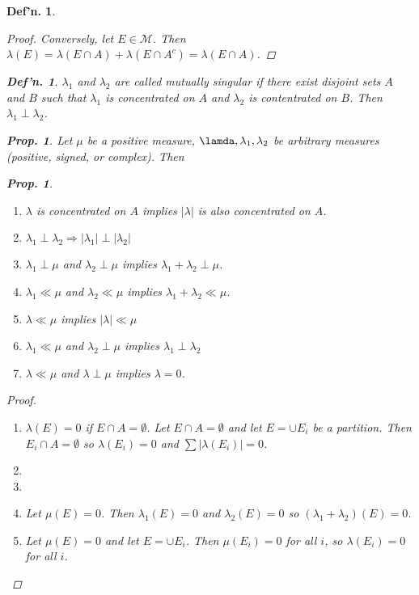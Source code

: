 \documentclass[12pt, a4paper]{book}
\newtheorem{definition}[theorem]{Def'n.}
\newtheorem{proposition}[theorem]{Prop.}
\theoremstyle{nonumberplain}
\newtheorem{proof}{Proof}
\begin{document}
\begin{definition}
\begin{proof}
    Conversely, let $E\in\mathcal{M}$.
    Then $\lambda(E)=\lambda(E\cap A)+\lambda(E\cap A^c)=\lambda(E\cap A)$.
\end{proof}
\begin{definition}
    $\lambda_1$ and $\lambda_2$ are called mutually singular if there exist disjoint sets $A$ and $B$ such that $\lambda_1$ is concentrated on $A$ and $\lambda_2$ is contentrated on $B$.
    Then $\lambda_1\perp\lambda_2$.
\end{definition}
\begin{proposition}
    Let $\mu$ be a positive measure, $\lamda,\lambda_1,\lambda_2$ be arbitrary measures (positive, signed, or complex).
    Then
\end{proposition}
\begin{proposition}
    \begin{enumerate}
        \item $\lambda$ is concentrated on $A$ implies $|\lambda|$ is also concentrated on $A$.
        \item $\lambda_1\perp\lambda_2\Rightarrow|\lambda_1|\perp|\lambda_2|$
        \item $\lambda_1\perp\mu$ and $\lambda_2\perp\mu$ implies $\lambda_1+\lambda_2\perp\mu$.
        \item $\lambda_1\ll\mu$ and $\lambda_2\ll\mu$ implies $\lambda_1+\lambda_2\ll\mu$.
        \item $\lambda\ll\mu$ implies $|\lambda|\ll\mu$
        \item $\lambda_1\ll\mu$ and $\lambda_2\perp\mu$ implies $\lambda_1\perp\lambda_2$
        \item $\lambda\ll\mu$ and $\lambda\perp\mu$ implies $\lambda=0$.
    \end{enumerate}
\end{proposition}
\begin{proof}
    \begin{enumerate}
        \item $\lambda(E)=0$ if $E\cap A=\emptyset$.
            Let $E\cap A=\emptyset$ and let $E=\cup E_i$ be a partition.
            Then $E_i\cap A=\emptyset$ so $\lambda(E_i)=0$ and $\sum|\lambda(E_i)|=0$.
        \item 
        \item
        \item Let $\mu(E)=0$.
            Then $\lambda_1(E)=0$ and $\lambda_2(E)=0$ so $(\lambda_1+\lambda_2)(E)=0$.
        \item Let $\mu(E)=0$ and let $E=\cup E_i$.
            Then $\mu(E_i)=0$ for all $i$, so $\lambda(E_i)=0$ for all $i$.

\end{enumerate}
\end{proof}
\end{definition}
\end{document}
